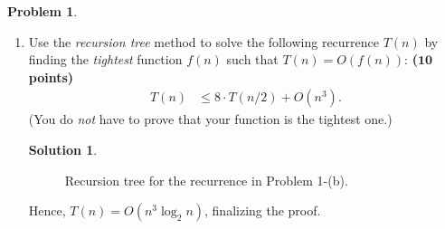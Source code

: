 \documentclass{article}
\theoremstyle{definition}
\newtheorem{problem}{Problem}
\newtheorem*{solution*}{Solution}
\newenvironment{solution}{\begin{solution*}}{{} \end{solution*}}
\newcommand{\grade}[1]{\hfill{\textbf{($\mathbf{#1}$ points)}}}
\begin{document}
\begin{problem}
\begin{enumerate}[label=(\alph*)]
	\newpage
	\item Use the \emph{recursion tree} method to solve the following recurrence $T(n)$ by finding the \emph{tightest} function $f(n)$ such that $T(n) = O(f(n))$:   \grade{10}
	\begin{align*}
		T(n) &\leq 8 \cdot T(n/2) + O(n^3). 
	\end{align*} 
	(You do \emph{not} have to prove that your function is the tightest one.) 
	\bigskip
	\begin{solution}
	\begin{figure}[h!]
			\centering
		\caption{Recursion tree for the recurrence in Problem 1-(b).} 
	\end{figure}
	
	Hence, $T(n) = O(n^3\log_2n)$, finalizing the proof.
	
\end{solution}

\end{enumerate}
\end{problem}

\newpage
\end{document}
